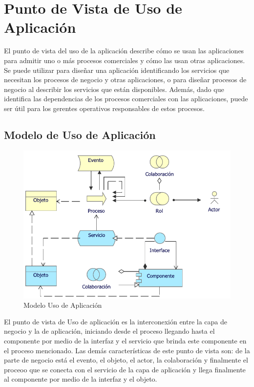 \section{Punto de Vista de Uso de Aplicación}

El punto de vista del uso de la aplicación describe cómo se usan las aplicaciones para admitir uno o más procesos comerciales y cómo las usan otras aplicaciones. Se puede utilizar para diseñar una aplicación identificando los servicios que necesitan los procesos de negocio y otras aplicaciones, o para diseñar procesos de negocio al describir los servicios que están disponibles. Además, dado que identifica las dependencias de los procesos comerciales con las aplicaciones, puede ser útil para los gerentes operativos responsables de estos procesos.


\subsection{Modelo de Uso de Aplicación}
\begin{figure}[h!]
	\centering
	\includegraphics[width=.8\linewidth]{imgs/modelo/UsoAplicacion}
	\caption{Modelo Uso de Aplicación}
\end{figure}

El punto de vista de Uso de aplicación es la interconexión entre la capa de negocio y la de aplicación, iniciando desde el proceso llegando hasta el componente por medio de la interfaz y el servicio que brinda este componente en el proceso mencionado. Las demás características de este punto de vista son: de la parte de negocio está el evento, el objeto, el actor, la colaboración y finalmente el proceoo que se conecta con el servicio de la capa de aplicación y llega finalmente al componente por medio de la interfaz y el objeto.

